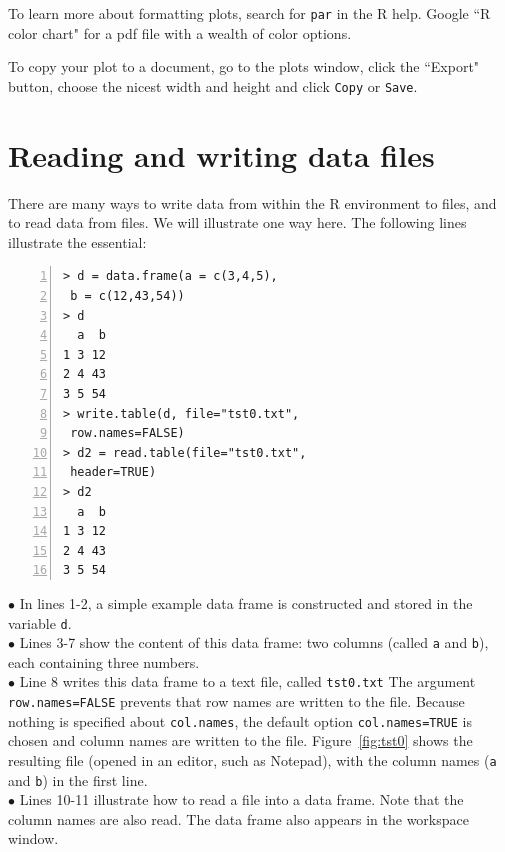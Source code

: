 \documentclass[a4paper,11pt,twocolumn,tablecaptionabove]{scrartcl}
\begin{document}
To learn more about formatting plots, search for \texttt{par} in the R help. 
Google ``R color chart" for a pdf file with a wealth of color options.

To copy your plot to a document, go to the plots window, click the ``Export" button, choose the nicest width and height and click \texttt{Copy} or \texttt{Save}. 


\section{Reading and writing data files}
\label{sec:reading-writing-data}

There are many ways to write data from within the R environment to files, and to read data from files. We will illustrate one way here. The following lines illustrate the essential:

\begin{Verbatim}[frame=single,numbers=left,gobble=0, xleftmargin=0.35cm, numbersep=0.1cm]
> d = data.frame(a = c(3,4,5), 
 b = c(12,43,54))
> d
  a  b
1 3 12
2 4 43
3 5 54
> write.table(d, file="tst0.txt",
 row.names=FALSE)
> d2 = read.table(file="tst0.txt", 
 header=TRUE)
> d2
  a  b
1 3 12
2 4 43
3 5 54
\end{Verbatim}
\noindent $\bullet$ In lines 1-2, a simple example data frame is constructed and stored in the
variable \texttt{d}. \\
\noindent $\bullet$ Lines 3-7 show the content of this data frame: two columns (called \texttt{a} and \texttt{b}), each containing three numbers.\\
\noindent $\bullet$ Line 8 writes this data frame to a text file, called \texttt{tst0.txt} The argument
\verb!row.names=FALSE! prevents that row names are written to the file. Because nothing is specified about \texttt{col.names}, the default option \verb!col.names=TRUE! is chosen
and column names are written to the file. Figure~\ref{fig:tst0}
shows the resulting file (opened in an editor, such as Notepad), with the
column names (\texttt{a} and \texttt{b}) in the first line. \\
\noindent $\bullet$ Lines 10-11 illustrate how to read a file into a data frame. Note that the column names are also read. The data frame also appears in the workspace window.\\
\end{document}
